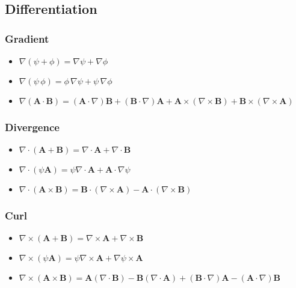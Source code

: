 \documentclass{article}
\begin{document}
\subsection{Differentiation}
\subsubsection{Gradient}
\begin{itemize}
\item
  $\nabla(\psi+\phi)=\nabla\psi+\nabla\phi $
\item
  $\nabla (\psi \, \phi) = \phi \,\nabla \psi  + \psi \,\nabla \phi $
\item
  $\nabla\left(\mathbf{A}\cdot\mathbf{B}\right)=
  \left(\mathbf{A}\cdot\nabla\right)\mathbf{B}
  +\left(\mathbf{B}\cdot\nabla\right)\mathbf{A}
  +\mathbf{A}\times\left(\nabla\times\mathbf{B}\right)
  +\mathbf{B}\times\left(\nabla\times\mathbf{A}\right) $
\end{itemize}

\subsubsection{Divergence}
\begin{itemize}
\item
  $\nabla\cdot(\mathbf{A}+\mathbf{B})=
  \nabla\cdot\mathbf{A}+\nabla\cdot\mathbf{B}$
\item
  $\nabla\cdot\left(\psi\mathbf{A}\right)=
  \psi\nabla\cdot\mathbf{A}+\mathbf{A}\cdot\nabla \psi $
\item
  $\nabla\cdot\left(\mathbf{A}\times\mathbf{B}\right)=
  \mathbf{B}\cdot(\nabla\times\mathbf{A})
  -\mathbf{A}\cdot(\nabla\times\mathbf{B})$
\end{itemize}

\subsubsection{Curl}
\begin{itemize}
\item
  $\nabla\times(\mathbf{A}+\mathbf{B})=
  \nabla\times\mathbf{A}+\nabla\times\mathbf{B} $
\item
  $\nabla\times\left(\psi\mathbf{A}\right)=
  \psi\nabla\times\mathbf{A}+\nabla\psi\times\mathbf{A}$
\item
  $\nabla\times\left(\mathbf{A}\times\mathbf{B}\right)=
  \mathbf{A}\left(\nabla\cdot\mathbf{B}\right)
  -\mathbf{B}\left(\nabla\cdot\mathbf{A}\right)
  +\left(\mathbf{B}\cdot\nabla\right)\mathbf{A}
  -\left(\mathbf{A}\cdot\nabla\right)\mathbf{B} $
\end{itemize}
\end{document}
